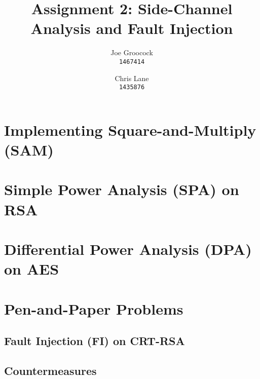\documentclass[11pt, a4paper]{article}
\title{Assignment 2: Side-Channel Analysis and Fault Injection}
\author{Joe Groocock    \\ \texttt{\normalsize 1467414}
    \and Chris Lane     \\ \texttt{\normalsize 1435876}
}
\begin{document}
\maketitle

\section{Implementing Square-and-Multiply (SAM)}\label{sec:sam}


\section{Simple Power Analysis (SPA) on RSA}\label{sec:spa}


\section{Differential Power Analysis (DPA) on AES}\label{sec:dpa}


\section{Pen-and-Paper Problems}\label{sec:pen-and-paper}
\subsection{Fault Injection (FI) on CRT-RSA}\label{subsec:fi}


\subsection{Countermeasures}\label{subsec:fi-countermeasures}
\end{document}
